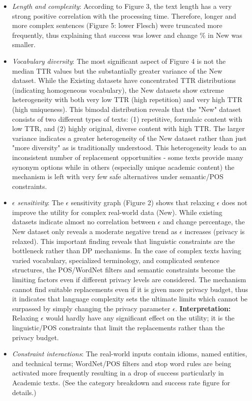 \documentclass[11pt]{article}
\begin{document}
\begin{itemize}[leftmargin=*]
  \item \textit{Length and complexity}: According to Figure 3, the text length has a very strong positive correlation with the processing time. Therefore, longer and more complex sentences (Figure 5: lower Flesch) were truncated more frequently, thus explaining that success was lower and change \% in New was smaller.
  \item \textit{Vocabulary diversity}: The most significant aspect of Figure 4 is not the median TTR values but the substantially greater variance of the New dataset. While the Existing datasets have concentrated TTR distributions (indicating homogeneous vocabulary), the New datasets show extreme heterogeneity with both very low TTR (high repetition) and very high TTR (high uniqueness). This bimodal distribution reveals that the "New" dataset consists of two different types of texts: (1) repetitive, formulaic content with low TTR, and (2) highly original, diverse content with high TTR. The larger variance indicates a greater heterogeneity of the New dataset rather than just "more diversity" as is traditionally understood. This heterogeneity leads to an inconsistent number of replacement opportunities - some texts provide many synonym options while in others (especially unique academic content) the mechanism is left with very few safe alternatives under semantic/POS constraints.
  \item \textit{$\epsilon$ sensitivity}: The $\epsilon$ sensitivity graph (Figure 2) shows that relaxing $\epsilon$ does not improve the utility for complex real-world data (New). While existing datasets indicate almost no correlation between $\epsilon$ and change percentage, the New dataset only reveals a moderate negative trend as $\epsilon$ increases (privacy is relaxed). This important finding reveals that linguistic constraints are the bottleneck rather than DP mechanisms. In the case of complex texts having varied vocabulary, specialized terminology, and complicated sentence structures, the POS/WordNet filters and semantic constraints become the limiting factors even if different privacy levels are considered. The mechanism cannot find suitable replacements even if it is given more privacy budget, thus it indicates that language complexity sets the ultimate limits which cannot be surpassed by simply changing the privacy parameter $\epsilon$.
  \textbf{Interpretation:} Relaxing $\epsilon$ would hardly have any significant effect on the utility; it is the linguistic/POS constraints that limit the replacements rather than the privacy budget.
  \item \textit{Constraint interactions}: The real-world inputs contain idioms, named entities, and technical terms; WordNet/POS filters and stop word rules are being activated more frequently resulting in a drop of success particularly in Academic texts. (See the category breakdown and success rate figure for details.)
\end{itemize}
\end{document}
